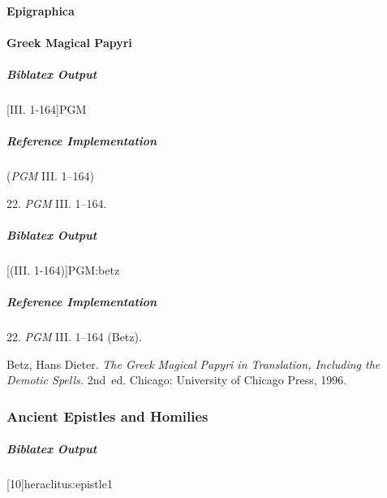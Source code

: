 \documentclass[a4paper]{article}
\newenvironment{biboutput}{%
  \subparagraph{Biblatex Output}
}{\color{black}}
\newenvironment{refimp}{%
  \subparagraph{Reference Implementation}
  \color{reference-colour}
  \rm
}{\par\color{black}}
\begin{document}
\paragraph{Epigraphica}

\paragraph{Greek Magical Papyri}

\begin{biboutput}
  [III. 1-164]{PGM}
\end{biboutput}

\begin{refimp}
  (\emph{PGM} III. 1–164)

  \hspace*{\bibindent}22. \emph{PGM} III. 1–164.

\end{refimp}

\begin{biboutput}
  [(III. 1-164)]{PGM:betz}
\end{biboutput}

\begin{refimp}
  \hspace*{\bibindent}22. \emph{PGM} III. 1–164 (Betz).

  \hangindent\bibindent Betz, Hans Dieter. \emph{The Greek Magical Papyri in
  Translation, Including the Demotic Spells.} 2nd~ed. Chicago: University of
  Chicago Press, 1996.

\end{refimp}

\subsubsection{Ancient Epistles and Homilies}

\begin{biboutput}
  [10]{heraclitus:epistle1}
\end{biboutput}
\end{document}
